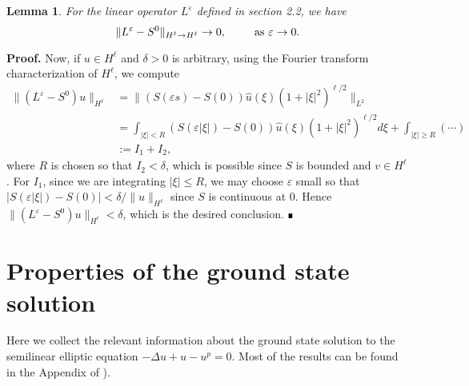 \documentclass[letterpaper,11pt]{article}
\newcommand{\eps}{\varepsilon}
\numberwithin{equation}{section}
\theoremstyle{plain}
\newtheorem{lemma}[theorem]{Lemma}
\theoremstyle{remark}
\newenvironment{Proof}[1][.]%
 {\begin{trivlist}\item[]\textbf{Proof#1 }}%
 {\hspace*{\fill}$\rule{0.3\baselineskip}{0.35\baselineskip}$\end{trivlist}}
\begin{document}
\begin{lemma} \label{Lest}
For the linear operator $L^\eps$ defined in section 2.2, we have
\[
\| L^\eps - S^0\|_{H^\ell\to H^\ell} \to 0, \hspace{0.3in}\text{ as }\eps \to 0.
\]
\end{lemma}
\begin{Proof}
Now, if $u \in H^\ell$ and $\delta>0$ is arbitrary, using the Fourier transform characterization of $H^\ell$, we compute
\begin{align*}
\|(L^\eps - S^0)u\|_{H^{\ell}} &= \|(S(\eps s)-S(0))\widehat{u}(\xi)(1+|\xi|^2)^{\ell/2}\|_{L^2} \\
& = \int_{|\xi|<R} (S(\eps |\xi|)-S(0))\widehat{u}(\xi)(1+|\xi|^2)^{\ell/2}d\xi + \int_{|\xi| \ge R} (\cdots)\\
& := I_1 + I_2,
\end{align*}
where $R$ is chosen so that $I_2 < \delta$, which is possible since $S$ is bounded and $v \in H^\ell$. For $I_1$, since we are integrating $|\xi|\le R$, we may choose $\eps$ small so that $|S(\eps|\xi|)-S(0)|<\delta/\|u\|_{H^\ell}$ since $S$ is continuous at $0$. Hence $\|(L^\eps-S^0)u\|_{H^\ell} < \delta$, which is the desired conclusion.
\end{Proof}

\section{Properties of the ground state solution}
Here we collect the relevant information about the ground state solution to the semilinear elliptic equation $-\Delta u + u - u^p = 0$. Most of the results can be found in the Appendix of \cite{wei2013mathematical}).
\end{document}
